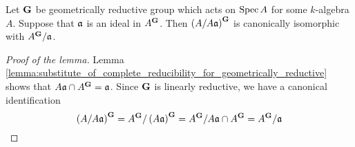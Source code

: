 \begin{lemma}\label{lemma:linearly_reductive_case_for_affine_quotients}
Let $\mathbf{G}$ be geometrically reductive group which acts on $\mathrm{Spec}\, A$ for some $k$-algebra $A$. Suppose that $\mathfrak{a}$ is an ideal in $A^{\mathbf{G}}$. Then $\left(A/A\mathfrak{a}\right)^{\mathbf{G}}$ is canonically isomorphic with $A^{\mathbf{G}}/\mathfrak{a}$.
\end{lemma}
\begin{proof}[Proof of the lemma]
Lemma \ref{lemma:substitute_of_complete_reducibility_for_geometrically_reductive} shows that $A\mathfrak{a}\cap A^{\mathbf{G}} = \mathfrak{a}$. Since $\mathbf{G}$ is linearly reductive, we have a canonical identification 
$$\left(A/A\mathfrak{a}\right)^{\mathbf{G}} = A^{\mathbf{G}}/\left(A\mathfrak{a}\right)^{\mathbf{G}} = A^{\mathbf{G}}/A\mathfrak{a}\cap A^{\mathbf{G}} = A^{\mathbf{G}}/\mathfrak{a}$$
\end{proof}


